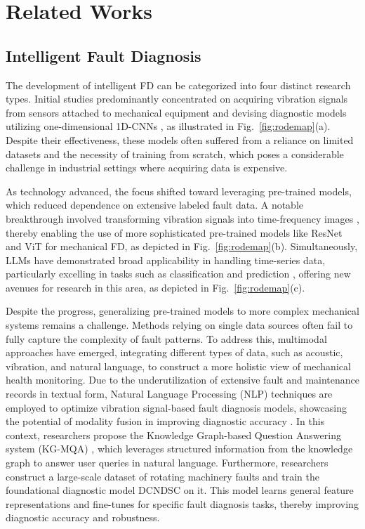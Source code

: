 \section{Related Works}
\label{sec:related_works}

\subsection{Intelligent Fault Diagnosis}
The development of intelligent FD can be categorized into four distinct research types.
Initial studies predominantly concentrated on acquiring vibration signals from sensors attached to mechanical equipment and devising diagnostic models utilizing one-dimensional 1D-CNNs \cite{zhang2017new,10419797,10571357}, as illustrated in Fig.~\ref{fig:rodemap}(a). 
Despite their effectiveness, these models often suffered from a reliance on limited datasets and the necessity of training from scratch, which poses a considerable challenge in industrial settings where acquiring data is expensive.

As technology advanced, the focus shifted toward leveraging pre-trained models, which reduced dependence on extensive labeled fault data. A notable breakthrough involved transforming vibration signals into time-frequency images \cite{10750065,shao2018highly}, thereby enabling the use of more sophisticated pre-trained models like ResNet \cite{he2016deep} and ViT \cite{dosovitskiy2020image} for mechanical FD, as depicted in Fig.~\ref{fig:rodemap}(b).
Simultaneously, LLMs have demonstrated broad applicability in handling time-series data, particularly excelling in tasks such as classification and prediction \cite{zhou2024one}, offering new avenues for research in this area, as depicted in Fig.~\ref{fig:rodemap}(c).

Despite the progress, generalizing pre-trained models to more complex mechanical systems remains a challenge. Methods relying on single data sources often fail to fully capture the complexity of fault patterns. To address this, multimodal approaches have emerged, integrating different types of data, such as acoustic, vibration, and natural language, to construct a more holistic view of mechanical health monitoring. 
Due to the underutilization of extensive fault and maintenance records in textual form, Natural Language Processing (NLP) techniques are employed to optimize vibration signal-based fault diagnosis models, showcasing the potential of modality fusion in improving diagnostic accuracy \cite{lowenmark2021technical}. In this context, researchers propose the Knowledge Graph-based Question Answering system (KG-MQA) \cite{10367777}, which leverages structured information from the knowledge graph to answer user queries in natural language. Furthermore, researchers construct a large-scale dataset of rotating machinery faults and train the foundational diagnostic model DCNDSC \cite{10520331} on it. This model learns general feature representations and fine-tunes for specific fault diagnosis tasks, thereby improving diagnostic accuracy and robustness.

